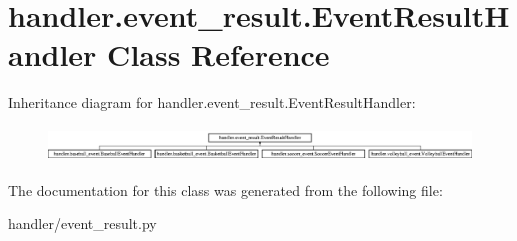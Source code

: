 \hypertarget{classhandler_1_1event__result_1_1_event_result_handler}{}\section{handler.\+event\+\_\+result.\+Event\+Result\+Handler Class Reference}
\label{classhandler_1_1event__result_1_1_event_result_handler}
Inheritance diagram for handler.\+event\+\_\+result.\+Event\+Result\+Handler\+:\begin{figure}[H]
\begin{center}
\leavevmode
\includegraphics[height=0.936455cm]{classhandler_1_1event__result_1_1_event_result_handler}
\end{center}
\end{figure}


The documentation for this class was generated from the following file\+:\begin{DoxyCompactItemize}
\item 
handler/event\+\_\+result.\+py\end{DoxyCompactItemize}
